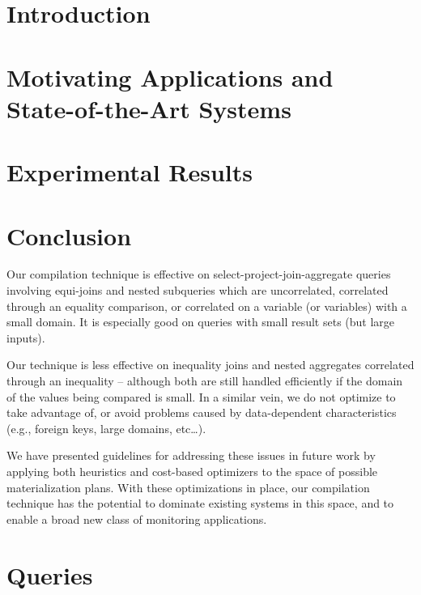 \documentclass{sig-alternate}
\begin{document}
\section{Introduction}
\label{sec:introduction}


\section{Motivating Applications and\\State-of-the-Art Systems}
\label{sec:sota}
%
%






\section{Experimental Results}
\label{sec:experiments}



\section{Conclusion}
\label{sec:conclusion}
Our compilation technique is effective on select-project-join-aggregate queries involving equi-joins and nested subqueries which are uncorrelated, correlated through an equality comparison, or correlated on a variable (or variables) with a small domain.  It is especially good on queries with small result sets (but large inputs).

Our technique is less effective on inequality joins and nested aggregates correlated through an inequality -- although both are still handled efficiently if the domain of the values being compared is small.  In a similar vein, we do not optimize to take advantage of, or avoid problems caused by data-dependent characteristics (e.g., foreign keys, large domains, etc\ldots). 

We have presented guidelines for addressing these issues in future work by applying both heuristics and cost-based optimizers to the space of possible materialization plans.  With these optimizations in place, our compilation technique has the potential to dominate existing systems in this space, and to enable a broad new class of monitoring applications.

\footnotesize{

}

\appendix
\section{Queries}
\label{app:queries}
\vspace{-4mm}

\end{document}
